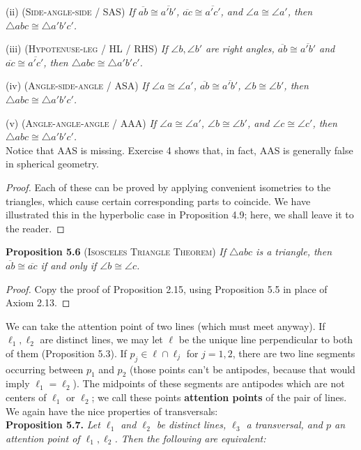 \documentclass[leqno]{book}
\begin{document}
(ii) \textsc{(Side-angle-side / SAS)} \emph{If $\overline{ab}\cong\overline{a'b'}$, $\overline{ac}\cong\overline{a'c'}$, and $\angle a\cong\angle a'$, then $\triangle abc\cong\triangle a'b'c'$.}

(iii) \textsc{(Hypotenuse-leg / HL / RHS)} \emph{If $\angle b,\angle b'$ are right angles, $\overline{ab}\cong\overline{a'b'}$ and $\overline{ac}\cong\overline{a'c'}$, then $\triangle abc\cong\triangle a'b'c'$.}

(iv) \textsc{(Angle-side-angle / ASA)} \emph{If $\angle a\cong\angle a'$, $\overline{ab}\cong\overline{a'b'}$, $\angle b\cong\angle b'$, then $\triangle abc\cong\triangle a'b'c'$.}

(v) \textsc{(Angle-angle-angle / AAA)} \emph{If $\angle a\cong\angle a'$, $\angle b\cong\angle b'$, and $\angle c\cong\angle c'$, then $\triangle abc\cong\triangle a'b'c'$.}\\

\noindent Notice that AAS is missing.  Exercise 4 shows that, in fact, AAS is generally false in spherical geometry.
\begin{proof}
Each of these can be proved by applying convenient isometries to the triangles, which cause certain corresponding parts to coincide.  We have illustrated this in the hyperbolic case in Proposition 4.9; here, we shall leave it to the reader.
\end{proof}
\noindent\textbf{Proposition 5.6} \textsc{(Isosceles Triangle Theorem)} \emph{If $\triangle abc$ is a triangle, then $\overline{ab}\cong\overline{ac}$ if and only if $\angle b\cong\angle c$.}
\begin{proof}
Copy the proof of Proposition 2.15, using Proposition 5.5 in place of Axiom 2.13.
\end{proof}

\noindent We can take the attention point of two lines (which must meet anyway).  If $\ell_1,\ell_2$ are distinct lines, we may let $\ell$ be the unique line perpendicular to both of them (Proposition 5.3).  If $p_j\in \ell\cap\ell_j$ for $j=1,2$, there are two line segments occurring between $p_1$ and $p_2$ (those points can't be antipodes, because that would imply $\ell_1=\ell_2$).  The midpoints of these segments are antipodes which are not centers of $\ell_1$ or $\ell_2$; we call these points \textbf{attention points} of the pair of lines.  We again have the nice properties of transversals:\\

\noindent\textbf{Proposition 5.7.} \emph{Let $\ell_1$ and $\ell_2$ be distinct lines, $\ell_3$ a transversal, and $p$ an attention point of $\ell_1,\ell_2$.  Then the following are equivalent:}
\end{document}
